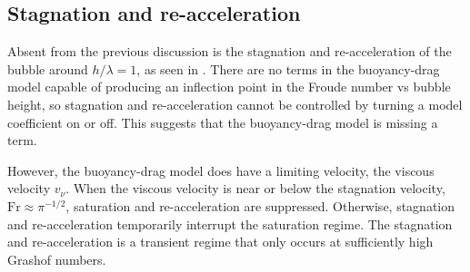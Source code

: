 \subsection{Stagnation and re-acceleration}

Absent from the previous discussion is the stagnation and re-acceleration of the bubble around $h / \lambda = 1$, as seen in .
There are no terms in the buoyancy-drag model capable of producing an inflection point in the Froude number vs bubble height, so stagnation and re-acceleration cannot be controlled by turning a model coefficient on or off.
This suggests that the buoyancy-drag model is missing a term.

However, the buoyancy-drag model does have a limiting velocity, the viscous velocity $v_\nu$.
When the viscous velocity is near or below the stagnation velocity, $\text{Fr} \approx \pi^{-1/2}$, saturation and re-acceleration are suppressed.
Otherwise, stagnation and re-acceleration temporarily interrupt the saturation regime.
The stagnation and re-acceleration is a transient regime that only occurs at sufficiently high Grashof numbers.


